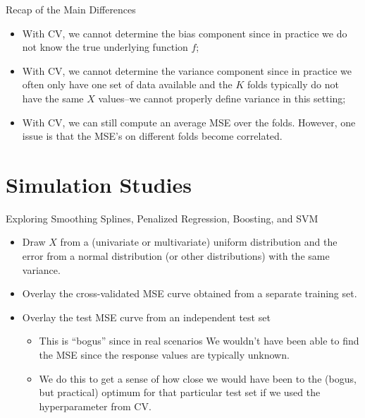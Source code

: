 \documentclass[
  ignorenonframetext,
]{beamer}
\providecommand{\tightlist}{%
  \setlength{\itemsep}{0pt}\setlength{\parskip}{0pt}}
\begin{document}
\begin{frame}{Recap of the Main Differences}
\protect\hypertarget{recap-of-the-main-differences}{}
\begin{itemize}
\tightlist
\item
  With CV, we cannot determine the bias component since in practice we do not know the true underlying function \(f\);
\item
  With CV, we cannot determine the variance component since in practice we often only have one set of data available and the \(K\) folds typically do not have the same \(X\) values--we cannot properly define variance in this setting;
\item
  With CV, we can still compute an average MSE over the folds. However, one issue is that the MSE's on different folds become correlated.
\end{itemize}
\end{frame}

\hypertarget{simulation-studies}{%
\section{Simulation Studies}\label{simulation-studies}}

\begin{frame}{Exploring Smoothing Splines, Penalized Regression, Boosting, and SVM}
\protect\hypertarget{exploring-smoothing-splines-penalized-regression-boosting-and-svm}{}
\begin{itemize}
\item
  Draw \(X\) from a (univariate or multivariate) uniform distribution and the error from a normal distribution (or other distributions) with the same variance.
\item
  Overlay the cross-validated MSE curve obtained from a separate training set.
\item
  Overlay the test MSE curve from an independent test set

  \begin{itemize}
  \tightlist
  \item
    This is ``bogus'' since in real scenarios We wouldn't have been able to find the MSE since the response values are typically unknown.
  \item
    We do this to get a sense of how close we would have been to the (bogus, but practical) optimum for that particular test set if we used the hyperparameter from CV.
  \end{itemize}
\end{itemize}
\end{frame}
\end{document}
